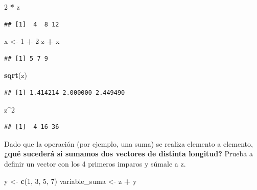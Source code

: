 \documentclass[11pt,]{book}
\newenvironment{Shaded}{\begin{snugshade}}{\end{snugshade}}
\newcommand{\DecValTok}[1]{\textcolor[rgb]{0.06,0.06,0.06}{#1}}
\newcommand{\KeywordTok}[1]{\textcolor[rgb]{0.27,0.27,0.27}{\textbf{#1}}}
\newcommand{\NormalTok}[1]{#1}
\newcommand{\OperatorTok}[1]{\textcolor[rgb]{0.43,0.43,0.43}{\textbf{#1}}}
\newcommand{\StringTok}[1]{\textcolor[rgb]{0.5,0.5,0.5}{#1}}
\begin{document}
\begin{Shaded}
\begin{Highlighting}[]
\DecValTok{2} \OperatorTok{*}\StringTok{ }\NormalTok{z}
\end{Highlighting}
\end{Shaded}

\begin{verbatim}
## [1]  4  8 12
\end{verbatim}

\begin{Shaded}
\begin{Highlighting}[]
\NormalTok{x <-}\StringTok{ }\DecValTok{1} \OperatorTok{+}\StringTok{ }\DecValTok{2}
\NormalTok{z }\OperatorTok{+}\StringTok{ }\NormalTok{x}
\end{Highlighting}
\end{Shaded}

\begin{verbatim}
## [1] 5 7 9
\end{verbatim}

\begin{Shaded}
\begin{Highlighting}[]
\KeywordTok{sqrt}\NormalTok{(z)}
\end{Highlighting}
\end{Shaded}

\begin{verbatim}
## [1] 1.414214 2.000000 2.449490
\end{verbatim}

\begin{Shaded}
\begin{Highlighting}[]
\NormalTok{z}\OperatorTok{^}\DecValTok{2}
\end{Highlighting}
\end{Shaded}

\begin{verbatim}
## [1]  4 16 36
\end{verbatim}

Dado que la operación (por ejemplo, una suma) se realiza elemento a elemento, \textbf{¿qué sucederá si sumamos dos vectores de distinta longitud?} Prueba a definir un vector con los 4 primeros imparos y súmale a z.

\begin{Shaded}
\begin{Highlighting}[]
\NormalTok{y <-}\StringTok{ }\KeywordTok{c}\NormalTok{(}\DecValTok{1}\NormalTok{, }\DecValTok{3}\NormalTok{, }\DecValTok{5}\NormalTok{, }\DecValTok{7}\NormalTok{)}
\NormalTok{variable_suma <-}\StringTok{ }\NormalTok{z }\OperatorTok{+}\StringTok{ }\NormalTok{y}
\end{Highlighting}
\end{Shaded}
\end{document}

